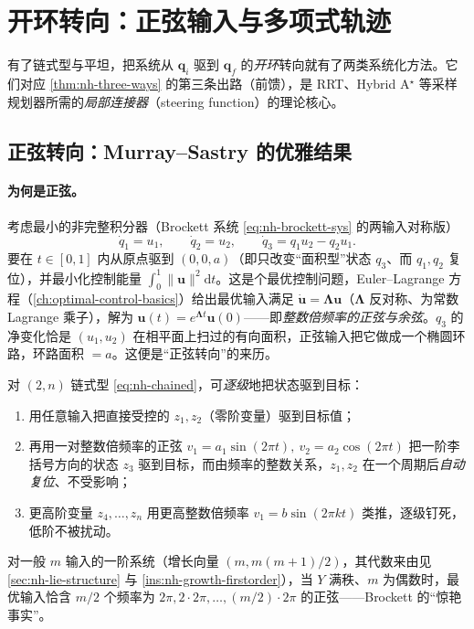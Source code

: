 \section{开环转向：正弦输入与多项式轨迹}
\label{sec:nh-steer}

有了链式型与平坦，把系统从 $\mathbf{q}_i$ 驱到 $\mathbf{q}_f$ 的\emph{开环}转向就有了两类系统化方法。它们对应 \cref{thm:nh-three-ways} 的第三条出路（前馈），是 RRT、Hybrid A$^\star$ 等采样规划器所需的\emph{局部连接器}（steering function）的理论核心。

\subsection{正弦转向：Murray--Sastry 的优雅结果}
\label{sec:nh-steer-sin}

\paragraph{为何是正弦。}
考虑最小的非完整积分器（Brockett 系统 \cref{eq:nh-brockett-sys} 的两输入对称版）
\begin{equation}
  \dot q_1=u_1,\qquad \dot q_2=u_2,\qquad \dot q_3=q_1 u_2-q_2 u_1 .
  \label{eq:nh-integrator}
\end{equation}
要在 $t\in[0,1]$ 内从原点驱到 $(0,0,a)$（即只改变“面积型”状态 $q_3$、而 $q_1,q_2$ 复位），并最小化控制能量 $\int_0^1\lVert\mathbf{u}\rVert^2\mathrm{d}t$。这是个最优控制问题，Euler--Lagrange 方程（\cref{ch:optimal-control-basics}）给出最优输入满足 $\dot{\mathbf{u}}=\boldsymbol{\Lambda}\mathbf{u}$（$\boldsymbol{\Lambda}$ 反对称、为常数 Lagrange 乘子），解为 $\mathbf{u}(t)=e^{\boldsymbol{\Lambda}t}\mathbf{u}(0)$——即\emph{整数倍频率的正弦与余弦}。$q_3$ 的净变化恰是 $(u_1,u_2)$ 在相平面上扫过的有向面积，正弦输入把它做成一个椭圆环路，环路面积 $=a$。这便是“正弦转向”的来历\cite{murray1993sinusoids}。

\begin{theorem}\label{thm:nh-sin-steer}
对 $(2,n)$ 链式型 \cref{eq:nh-chained}，可\emph{逐级}地把状态驱到目标：
\begin{enumerate}
  \item 用任意输入把直接受控的 $z_1,z_2$（零阶变量）驱到目标值；
  \item 再用一对整数倍频率的正弦 $v_1=a_1\sin(2\pi t),\ v_2=a_2\cos(2\pi t)$ 把一阶李括号方向的状态 $z_3$ 驱到目标，而由频率的整数关系，$z_1,z_2$ 在一个周期后\emph{自动复位}、不受影响；
  \item 更高阶变量 $z_4,\dots,z_n$ 用更高整数倍频率 $v_1=b\sin(2\pi k t)$ 类推，逐级钉死，低阶不被扰动。
\end{enumerate}
对一般 $m$ 输入的一阶系统（增长向量 $(m,m(m{+}1)/2)$，其代数来由见 \cref{sec:nh-lie-structure} 与 \cref{ins:nh-growth-firstorder}），当 $Y$ 满秩、$m$ 为偶数时，最优输入恰含 $m/2$ 个频率为 $2\pi,2\cdot2\pi,\dots,(m/2)\cdot2\pi$ 的正弦——Brockett 的“惊艳事实”。
\end{theorem}

